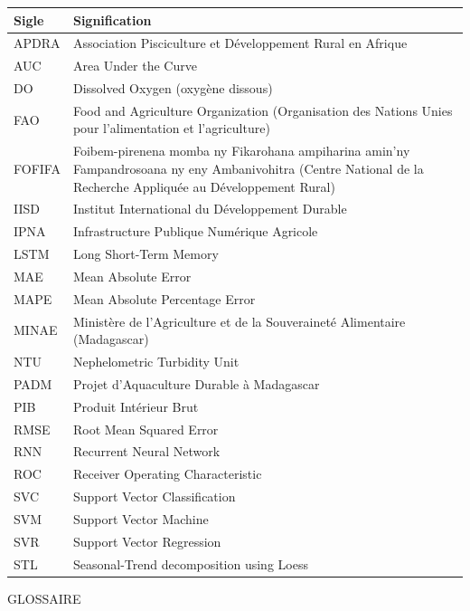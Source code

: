 \documentclass[a4paper,12pt, oneside]{article}
\begin{document}
\begin{longtable}{|p{3.5cm}|p{13cm}|}
\hline
\textbf{Sigle} & \textbf{Signification} \\
\hline
APDRA & Association Pisciculture et Développement Rural en Afrique \\
\hline
AUC & Area Under the Curve \\
\hline
DO & Dissolved Oxygen (oxygène dissous) \\
\hline
FAO & Food and Agriculture Organization (Organisation des Nations Unies pour l'alimentation et l'agriculture) \\
\hline
FOFIFA & Foibem-pirenena momba ny Fikarohana ampiharina amin'ny Fampandrosoana ny eny Ambanivohitra (Centre National de la Recherche Appliquée au Développement Rural) \\
\hline
IISD & Institut International du Développement Durable \\
\hline
IPNA & Infrastructure Publique Numérique Agricole \\
\hline
LSTM & Long Short-Term Memory \\
\hline
MAE & Mean Absolute Error \\
\hline
MAPE & Mean Absolute Percentage Error \\
\hline
MINAE & Ministère de l'Agriculture et de la Souveraineté Alimentaire (Madagascar) \\
\hline
NTU & Nephelometric Turbidity Unit \\
\hline
PADM & Projet d'Aquaculture Durable à Madagascar \\
\hline
PIB & Produit Intérieur Brut \\
\hline
RMSE & Root Mean Squared Error \\
\hline
RNN & Recurrent Neural Network \\
\hline
ROC & Receiver Operating Characteristic \\
\hline
SVC & Support Vector Classification \\
\hline
SVM & Support Vector Machine \\
\hline
SVR & Support Vector Regression \\
\hline
STL & Seasonal-Trend decomposition using Loess \\
\hline
\end{longtable}

\vspace*{\fill}
\newpage

\begin{center}
\LARGE GLOSSAIRE
\end{center}
\end{document}
